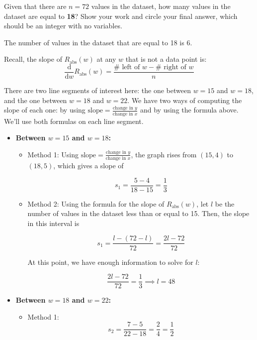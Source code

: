 \documentclass[11pt]{article}
\begin{document}
\begin{prob}[(16 pts)]
Given that there are $n = 72$ values in the dataset, how many values in the dataset are equal to \textbf{18}? Show your work and $\boxed{\text{circle}}$ your final answer, which should be an integer with no variables. 

\emptybox{12.5cm}

\begin{solution} The number of values in the dataset that are equal to 18 is 6.

Recall, the slope of $R_\text{abs}(w)$ at any $w$ that is not a data point is:
$$\frac{\text{d}}{\text{d}w} R_\text{abs}(w) = \frac{\# \text{ left of } w - \# \text{ right of } w}{n}$$

There are two line segments of interest here: the one between $w=15$ and $w=18$, and the one between $w=18$ and $w=22$. We have two ways of computing the slope of each one: by using $\text{slope} = \frac{\text{change in } y}{\text{change in } x}$ and by using the formula above. We'll use both formulas on each line segment.

\begin{itemize}
    \item \textbf{Between $w=15$ and $w=18$:} 
    
    \begin{itemize}
        \item Method 1: Using $\text{slope} = \frac{\text{change in } y}{\text{change in } x}$, the graph rises from $(15, 4)$ to $(18, 5)$, which gives a slope of
        
        $$s_1 = \frac{5 - 4}{18 - 15} = \frac{1}{3}$$
        
        \item Method 2: Using the formula for the slope of $R_\text{abs}(w)$, let $l$ be the number of values in the dataset less than or equal to 15. Then, the slope in this interval is
        
        $$s_1 = \frac{l - (72 - l)}{72} = \frac{2l - 72}{72}$$

        At this point, we have enough information to solve for $l$:

        $$\frac{2l - 72}{72} = \frac{1}{3} \implies l = 48$$
    \end{itemize}
    \item \textbf{Between $w=18$ and $w=22$:}
    
    \begin{itemize}
        \item Method 1: 
        $$s_2 = \frac{7 - 5}{22 - 18} = \frac{2}{4} = \frac{1}{2}$$
        

\end{itemize}
\end{itemize}
\end{solution}
\end{prob}
\end{document}
